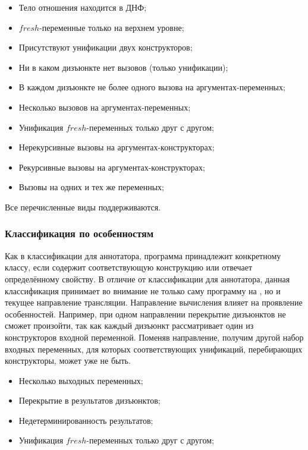 \begin{itemize}
    \item Тело отношения находится в ДНФ;
    \item $fresh$-переменные только на верхнем уровне;
    \item Присутствуют унификации двух конструкторов;
    \item Ни в каком дизъюнкте нет вызовов (только унификации);
    \item В каждом дизъюнкте не более одного вызова на аргументах-переменных;
    \item Несколько вызовов на аргументах-переменных;
    \item Унификация $fresh$-переменных только друг с другом;
    \item Нерекурсивные вызовы на аргументах-конструкторах;
    \item Рекурсивные вызовы на аргументах-конструкторах;
    \item Вызовы на одних и тех же переменных;
\end{itemize}

Все перечисленные виды поддерживаются.


\subsubsection{Классификация по особенностям \miniKanren{}}

Как в классификации для аннотатора, программа принадлежит конкретному классу, если содержит соответствующую конструкцию или отвечает определённому свойству.
В отличие от классификации для аннотатора, данная классификация принимает во внимание не только саму программу на \miniKanren{}, но и текущее направление трансляции.
Направление вычисления влияет на проявление особенностей.
Например, при одном направлении перекрытие дизъюнктов не сможет произойти, так как каждый дизъюнкт рассматривает один из конструкторов входной переменной.
Поменяв направление, получим другой набор входных переменных, для которых соответствующих унификаций, перебирающих конструкторы, может уже не быть.

\begin{itemize}
    \item Несколько выходных переменных;
    \item Перекрытие в результатов дизъюнктов;
    \item Недетерминированность результатов;
    \item Унификация $fresh$-переменных только друг с другом;
\end{itemize}


